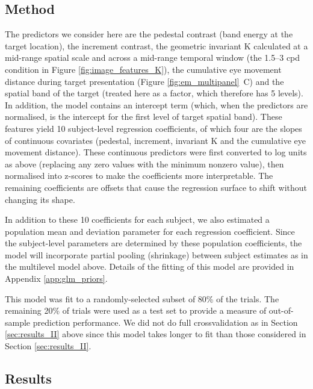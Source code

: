 \documentclass[11pt,a4paper]{article}
\begin{document}
{\subsection{Method}

The predictors we consider here are the pedestal contrast (band energy at the target location), the increment contrast, the geometric invariant K calculated at a mid-range spatial scale and across a mid-range temporal window (the 1.5--3 cpd condition in Figure \ref{fig:image_features_K}), the cumulative eye movement distance during target presentation (Figure \ref{fig:em_multipanel}~C) and the spatial band of the target (treated here as a factor, which therefore has 5 levels).
In addition, the model contains an intercept term (which, when the predictors are normalised, is the intercept for the first level of target spatial band).
These features yield 10 subject-level regression coefficients, of which four are the slopes of continuous covariates (pedestal, increment, invariant K and the cumulative eye movement distance).
These continuous predictors were first converted to log units as above (replacing any zero values with the minimum nonzero value), then normalised into z-scores to make the coefficients more interpretable.
The remaining coefficients are offsets that cause the regression surface to shift without changing its shape.

In addition to these 10 coefficients for each subject, we also estimated a population mean and deviation parameter for each regression coefficient.
Since the subject-level parameters are determined by these population coefficients, the model will incorporate partial pooling (shrinkage) between subject estimates as in the multilevel model above.
Details of the fitting of this model are provided in Appendix \ref{app:glm_priors}.

This model was fit to a randomly-selected subset of 80\% of the trials.
The remaining 20\% of trials were used as a test set to provide a measure of out-of-sample prediction performance.
We did not do full crossvalidation as in Section \ref{sec:results_II} above since this model takes longer to fit than those considered in Section \ref{sec:results_II}.

\subsection{Results}

}
\end{document}
